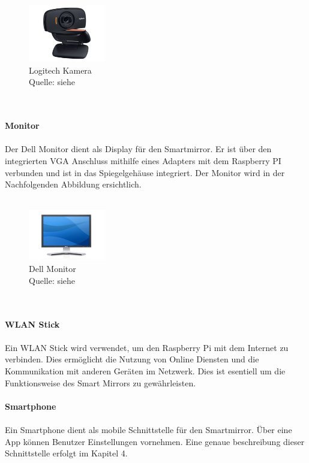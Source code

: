 \noindent
\begin{figure}[h]
    \centering
    \includegraphics[width=0.3\textwidth]{pictures/logitech_kamera.png}
  \captionsetup{justification=centering, labelformat=simple, singlelinecheck=false}
    \caption[Logitech Kamera]{Logitech Kamera\\ Quelle: siehe \cite{logitech_camera}}
\end{figure} \\ \\
\noindent
\textbf{Monitor} \\ \\
Der Dell Monitor dient als Display für den Smartmirror. Er ist über den integrierten VGA Anschluss mithilfe eines Adapters mit dem Raspberry PI verbunden und ist in das Spiegelgehäuse integriert. Der Monitor wird in der Nachfolgenden Abbildung ersichtlich. \\ \\
\noindent
\begin{figure}[h]
    \centering
    \includegraphics[width=0.3\textwidth]{pictures/dell_monitor.jpg}
  \captionsetup{justification=centering, labelformat=simple, singlelinecheck=false}
    \caption[Dell Monitor]{Dell Monitor\\ Quelle:  siehe \cite{dell_monitor}}
\end{figure} \\ \\
\noindent
\textbf{WLAN Stick} \\ \\
Ein WLAN Stick wird verwendet, um den Raspberry Pi mit dem Internet zu verbinden. Dies ermöglicht die Nutzung von Online Diensten und die Kommunikation mit anderen Geräten im Netzwerk. Dies ist esentiell um die Funktionsweise des Smart Mirrors zu gewährleisten. \\ \\
\noindent
\textbf{Smartphone} \\ \\
Ein Smartphone dient als mobile Schnittstelle für den Smartmirror. Über eine App können Benutzer Einstellungen vornehmen. Eine genaue beschreibung dieser Schnittstelle erfolgt im Kapitel 4. \\ \\
\noindent
